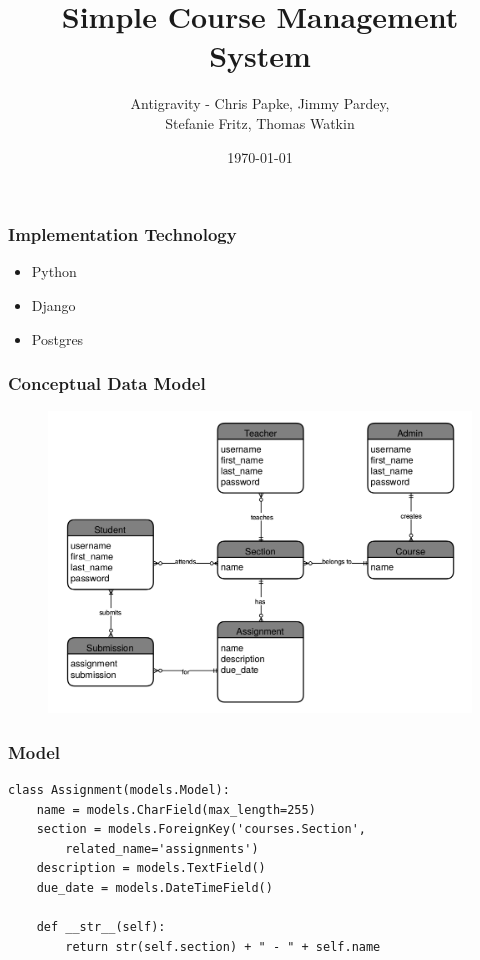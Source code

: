 \documentclass{beamer}
\begin{document}
\title[Group Project]{Simple Course Management System}
\author{Antigravity - Chris Papke, Jimmy Pardey, \\Stefanie Fritz, Thomas Watkin}
\date{\today}

\begin{frame}[plain]
\titlepage
\end{frame}

\begin{frame}[fragile]
\frametitle{Implementation Technology}
\begin{itemize}
	\item Python
	\item Django
	\item Postgres
\end{itemize}
\end{frame}

\begin{frame}[fragile]
\frametitle{Conceptual Data Model}

\begin{figure}
	\includegraphics[width=\textwidth]{ER.png}
\end{figure}
\end{frame}


\begin{frame}[fragile]
\frametitle{Model}

\begin{lstlisting}[basicstyle=\small]
class Assignment(models.Model):
    name = models.CharField(max_length=255)
    section = models.ForeignKey('courses.Section', 
        related_name='assignments')
    description = models.TextField()
    due_date = models.DateTimeField()

    def __str__(self):
        return str(self.section) + " - " + self.name
\end{lstlisting}
\end{frame}
\end{document}
